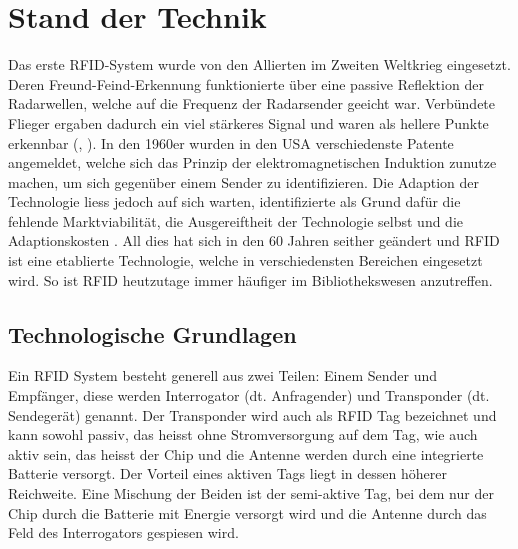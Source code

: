 \chapter{Stand der Technik}
\label{ch:StandDerTechnik}

Das erste \gls{RFID}-System wurde von den Allierten im Zweiten Weltkrieg eingesetzt. Deren Freund-Feind-Erkennung funktionierte über eine passive Reflektion der Radarwellen, welche auf die Frequenz der Radarsender geeicht war. Verbündete Flieger ergaben dadurch ein viel stärkeres Signal und waren als hellere Punkte erkennbar (\cite{chawla2007}, \cite{uswardep1946_3}). In den 1960er wurden in den USA verschiedenste Patente angemeldet, welche sich das Prinzip der elektromagnetischen Induktion zunutze machen, um sich gegenüber einem Sender zu identifizieren. Die Adaption der Technologie liess jedoch auf sich warten, \citeauthor{want2004} identifizierte als Grund dafür die fehlende Marktviabilität, die Ausgereiftheit der Technologie selbst und die Adaptionskosten \parencite{want2004}. All dies hat sich in den 60 Jahren seither geändert und \gls{RFID} ist eine etablierte Technologie, welche in verschiedensten Bereichen eingesetzt wird. So ist \gls{RFID} heutzutage immer häufiger im Bibliothekswesen anzutreffen.

\section{Technologische Grundlagen}

Ein \gls{RFID} System besteht generell aus zwei Teilen: Einem Sender und Empfänger, diese werden Interrogator (dt. Anfragender) und Transponder (dt. Sendegerät) genannt. Der Transponder wird auch als \gls{RFID} Tag bezeichnet und kann sowohl passiv, das heisst ohne Stromversorgung auf dem Tag, wie auch aktiv sein, das heisst der Chip und die Antenne werden durch eine integrierte Batterie versorgt. Der Vorteil eines aktiven Tags liegt in dessen höherer Reichweite. Eine Mischung der Beiden ist der semi-aktive Tag, bei dem nur der Chip durch die Batterie mit Energie versorgt wird und die Antenne durch das Feld des Interrogators gespiesen wird.


